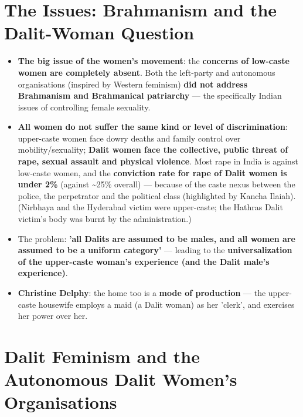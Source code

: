 \section{The Issues: Brahmanism and the Dalit-Woman Question}

\begin{CriticalPoint}
\begin{itemize}
\item \textbf{The big issue of the women's movement}: the \textbf{concerns of low-caste women are completely absent}. Both the left-party and autonomous organisations (inspired by Western feminism) \textbf{did not address Brahmanism and Brahmanical patriarchy} --- the specifically Indian issues of controlling female sexuality.
\item \textbf{All women do not suffer the same kind or level of discrimination}: upper-caste women face dowry deaths and family control over mobility/sexuality; \textbf{Dalit women face the collective, public threat of rape, sexual assault and physical violence}. Most rape in India is against low-caste women, and the \textbf{conviction rate for rape of Dalit women is under 2\%} (against \textasciitilde{}25\% overall) --- because of the caste nexus between the police, the perpetrator and the political class (highlighted by Kancha Ilaiah). (Nirbhaya and the Hyderabad victim were upper-caste; the Hathras Dalit victim's body was burnt by the administration.)
\item The problem: \textbf{'all Dalits are assumed to be males, and all women are assumed to be a uniform category'} --- leading to the \textbf{universalization of the upper-caste woman's experience (and the Dalit male's experience)}.
\item \textbf{Christine Delphy}: the home too is a \textbf{mode of production} --- the upper-caste housewife employs a maid (a Dalit woman) as her 'clerk', and exercises her power over her.
\end{itemize}
\end{CriticalPoint}

\section{Dalit Feminism and the Autonomous Dalit Women's Organisations}

